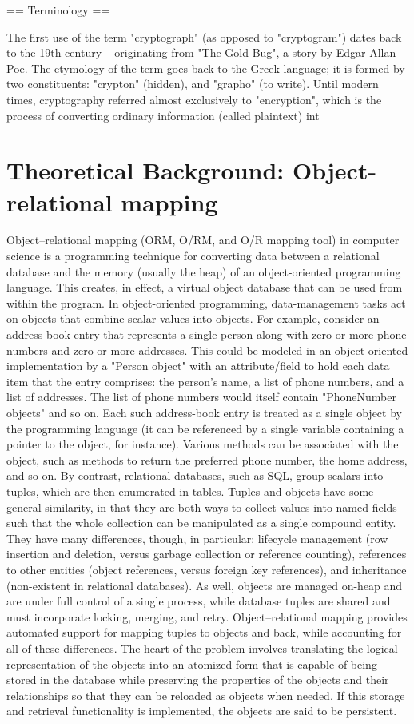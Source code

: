 \documentclass[12pt,a4paper]{report}
\begin{document}
== Terminology ==

The first use of the term "cryptograph" (as opposed to "cryptogram") dates back to the 19th century – originating from "The Gold-Bug", a story by Edgar Allan Poe. The etymology of the term goes back to the Greek language; it is formed by two constituents: "crypton" (hidden), and "grapho" (to write).
Until modern times, cryptography referred almost exclusively to "encryption", which is the process of converting ordinary information (called plaintext) int

\section{Theoretical Background: Object-relational mapping}
Object–relational mapping (ORM, O/RM, and O/R mapping tool) in computer science is a programming technique for converting data between a relational database and the memory (usually the heap) of an object-oriented programming language. This creates, in effect, a virtual object database that can be used from within the program.
In object-oriented programming, data-management tasks act on objects that combine scalar values into objects. For example, consider an address book entry that represents a single person along with zero or more phone numbers and zero or more addresses. This could be modeled in an object-oriented implementation by a "Person object" with an attribute/field to hold each data item that the entry comprises: the person's name, a list of phone numbers, and a list of addresses. The list of phone numbers would itself contain "PhoneNumber objects" and so on. Each such address-book entry is treated as a single object by the programming language (it can be referenced by a single variable containing a pointer to the object, for instance). Various methods can be associated with the object, such as methods to return the preferred phone number, the home address, and so on.
By contrast, relational databases, such as SQL, group scalars into tuples, which are then enumerated in tables. Tuples and objects have some general similarity, in that they are both ways to collect values into named fields such that the whole collection can be manipulated as a single compound entity. They have many differences, though, in particular: lifecycle management (row insertion and deletion, versus garbage collection or reference counting), references to other entities (object references, versus foreign key references), and inheritance (non-existent in relational databases). As well, objects are managed on-heap and are under full control of a single process, while database tuples are shared and must incorporate locking, merging, and retry. Object–relational mapping provides automated support for mapping tuples to objects and back, while accounting for all of these differences.
The heart of the problem involves translating the logical representation of the objects into an atomized form that is capable of being stored in the database while preserving the properties of the objects and their relationships so that they can be reloaded as objects when needed. If this storage and retrieval functionality is implemented, the objects are said to be persistent.
\end{document}
